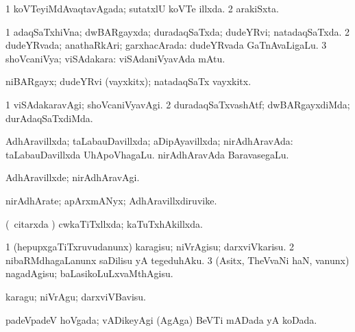 {\bentry
{} 
\gl{\gu}
\expl{}
\bmng
\bnum
\num{1} koVTeyiMdAvaqtavAgada; sutatxlU koVTe illxda. 
\num{2} arakiSxta. 
\enum
\emng
\eentry

\bentry
{} 
\gl{\gu}
\expl{}
\bmng
\bnum
\num{1} adaqSaTxhiVna; dwBARgayxda; duradaqSaTxda; dudeYRvi; natadaqSaTxda. 
\num{2} dudeYRvada; anathaRkAri; garxhacArada:  dudeYRvada GaTnAvaLigaLu. 
\num{3} shoVcaniVya; viSAdakara:  viSAdaniVyavAda mAtu. 
\enum
\emng
\eentry

\bentry
{} 
\gl{\nA}
\expl{}
\bmng
 niBARgayx; dudeYRvi (vayxkitx); natadaqSaTx vayxkitx. 
\emng
\eentry

\bentry
{} 
\gl{\kirxvi}
\expl{}
\bmng
\bnum
\num{1} viSAdakaravAgi; shoVcaniVyavAgi. 
\num{2} duradaqSaTxvashAtf; dwBARgayxdiMda; durAdaqSaTxdiMda. 
\enum
\emng
\eentry

\bentry
{} 
\gl{\gu}
\expl{}
\bmng
AdhAravillxda; taLabauDavillxda; aDipAyavillxda; nirAdhAravAda:  taLabauDavillxda UhApoVhagaLu.  nirAdhAravAda BaravasegaLu. 
\emng
\eentry

\bentry
{} 
\gl{\kirxvi}
\expl{}
\bmng
 AdhAravillxde; nirAdhAravAgi.\eng{} 
\emng
\eentry

\bentry
{} 
\gl{\nA}
\expl{}
\bmng
nirAdhArate; apArxmANyx; AdhAravillxdiruvike. 
\emng
\eentry

\bentry
{} 
\gl{\gu}
\expl{}
\bmng
 (\kanmu\ citarxda \vi) cwkaTiTxllxda; kaTuTxhAkillxda.\eng{ } 
\emng
\eentry

\bentry
{} 
\gl{\kirx}


\noindent
\gl{\sakirx}
\expl{}
\bmng
\bnum
\num{1} (hepupxgaTiTxruvudanunx) karagisu; niVrAgisu; darxviVkarisu. 
\num{2} nibaRMdhagaLanunx saDilisu yA tegeduhAku. 
\num{3} (Asitx, TheVvaNi haN, \mo vanunx) nagadAgisu; baLasikoLuLxvaMthAgisu. 
\enum
\emng

\noindent 
\gl{\akirx}
\expl{}
\bmng
karagu; niVrAgu; darxviVBavisu. 
\emng
\eentry

\bentry
{} 
\gl{\gu}
\expl{}
\bmng
padeVpadeV hoVgada; vADikeyAgi (AgAga) BeVTi mADada yA koDada. 
\emng
\eentry

}
